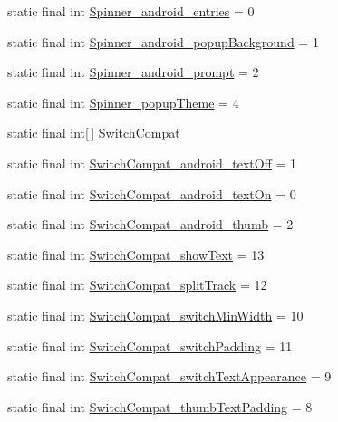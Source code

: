 \begin{CompactItemize}
\item 
static final int \hyperlink{classandroid_1_1support_1_1v4_1_1_r_1_1styleable_e1857fbb0172a2ba1e3b518c6dacac0d}{Spinner\_\-android\_\-entries} = 0
\item 
static final int \hyperlink{classandroid_1_1support_1_1v4_1_1_r_1_1styleable_101054d5ddcc269aa79631d35504d107}{Spinner\_\-android\_\-popupBackground} = 1
\item 
static final int \hyperlink{classandroid_1_1support_1_1v4_1_1_r_1_1styleable_66514c7282401aadd8fcf1b7cf06da7a}{Spinner\_\-android\_\-prompt} = 2
\item 
static final int \hyperlink{classandroid_1_1support_1_1v4_1_1_r_1_1styleable_b914ffabdea8381281dd34343fb1a5f1}{Spinner\_\-popupTheme} = 4
\item 
static final int\mbox{[}$\,$\mbox{]} \hyperlink{classandroid_1_1support_1_1v4_1_1_r_1_1styleable_276d9c1ec80821a3e0fcdaa41daa75a0}{SwitchCompat}
\item 
static final int \hyperlink{classandroid_1_1support_1_1v4_1_1_r_1_1styleable_475ea27dd698f2f7fb83ff65423189c3}{SwitchCompat\_\-android\_\-textOff} = 1
\item 
static final int \hyperlink{classandroid_1_1support_1_1v4_1_1_r_1_1styleable_8198d90992e4ff6dfd99cdd17ff4deef}{SwitchCompat\_\-android\_\-textOn} = 0
\item 
static final int \hyperlink{classandroid_1_1support_1_1v4_1_1_r_1_1styleable_2499279c732b44c04537677dfc6988b4}{SwitchCompat\_\-android\_\-thumb} = 2
\item 
static final int \hyperlink{classandroid_1_1support_1_1v4_1_1_r_1_1styleable_0cc5a1a2d3ed39ddffe812e716bf2ef4}{SwitchCompat\_\-showText} = 13
\item 
static final int \hyperlink{classandroid_1_1support_1_1v4_1_1_r_1_1styleable_a0d331497170a5613b2fe77a4e795649}{SwitchCompat\_\-splitTrack} = 12
\item 
static final int \hyperlink{classandroid_1_1support_1_1v4_1_1_r_1_1styleable_98a2bf49a68fe279d68595eef6c847a2}{SwitchCompat\_\-switchMinWidth} = 10
\item 
static final int \hyperlink{classandroid_1_1support_1_1v4_1_1_r_1_1styleable_86212afa1c1fecc95d7678773e2d9e52}{SwitchCompat\_\-switchPadding} = 11
\item 
static final int \hyperlink{classandroid_1_1support_1_1v4_1_1_r_1_1styleable_60389d42c7e89427896a6b7567ba54a5}{SwitchCompat\_\-switchTextAppearance} = 9
\item 
static final int \hyperlink{classandroid_1_1support_1_1v4_1_1_r_1_1styleable_8ad125e9cbf83b9f8f070fdeab78cbbe}{SwitchCompat\_\-thumbTextPadding} = 8

\end{CompactItemize}
